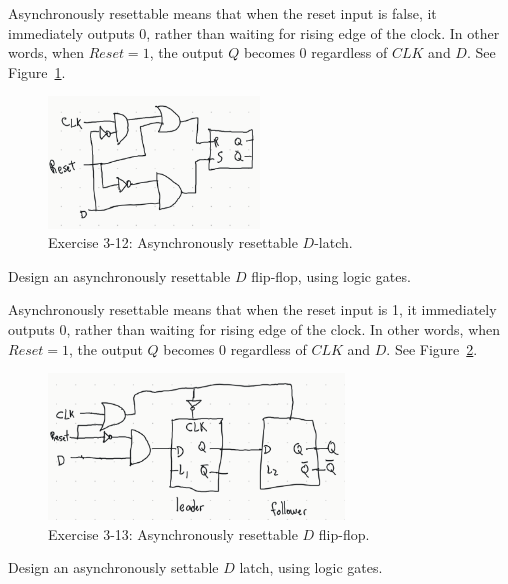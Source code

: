 \documentclass[12pt]{article}
\newenvironment{ex}[2][Exercise]{\begin{trivlist}
		\item[\hskip \labelsep {\bfseries #1}\hskip \labelsep {\bfseries #2.}]}{\end{trivlist}}
\newenvironment{sol}[1][Solution]{\begin{trivlist}
		\item[\hskip \labelsep {\bfseries #1:}]}{\end{trivlist}}
\begin{document}
\begin{sol}
	Asynchronously resettable means that when the reset input is false, it immediately outputs 0, rather
	than waiting for rising edge of the clock. In other words, when $Reset=1$, the output $Q$ becomes 0 regardless of $CLK$ and $D$. See Figure~\ref{03-12-async-resettable-D-latch}.
	\begin{figure}
		\centering
		\includegraphics[width=0.5\textwidth]{03-12-async-resettable-D-latch}
		\caption{Exercise 3-12: Asynchronously resettable $D$-latch.}
		\label{03-12-async-resettable-D-latch}
	\end{figure}
\end{sol}

\begin{ex}{3.13}
	Design an asynchronously resettable $D$ flip-flop, using logic gates.
\end{ex}

\begin{sol}
	Asynchronously resettable means that when the reset input is 1, it immediately outputs 0, rather
	than waiting for rising edge of the clock. In other words, when $Reset=1$, the output $Q$ becomes 0 regardless of $CLK$ and $D$. See Figure~\ref{03-13-async-resettable-D-flip-flop}.
	\begin{figure}
		\centering
		\includegraphics[width=0.7\textwidth]{03-13-async-resettable-D-flip-flop}
		\caption{Exercise 3-13: Asynchronously resettable $D$ flip-flop.}
		\label{03-13-async-resettable-D-flip-flop}
	\end{figure}
\end{sol}

\begin{ex}{3.14}
	Design an asynchronously settable $D$ latch, using logic gates.
\end{ex}
\end{document}
